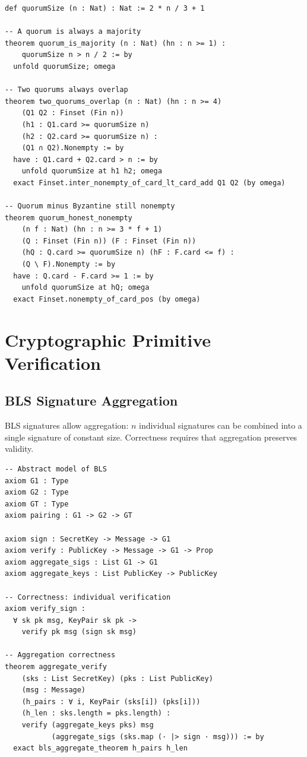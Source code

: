 \documentclass[11pt,a4paper]{article}
\begin{document}
\begin{lstlisting}[language=Lean,caption={Quorum properties}]
def quorumSize (n : Nat) : Nat := 2 * n / 3 + 1

-- A quorum is always a majority
theorem quorum_is_majority (n : Nat) (hn : n >= 1) :
    quorumSize n > n / 2 := by
  unfold quorumSize; omega

-- Two quorums always overlap
theorem two_quorums_overlap (n : Nat) (hn : n >= 4)
    (Q1 Q2 : Finset (Fin n))
    (h1 : Q1.card >= quorumSize n)
    (h2 : Q2.card >= quorumSize n) :
    (Q1 ∩ Q2).Nonempty := by
  have : Q1.card + Q2.card > n := by
    unfold quorumSize at h1 h2; omega
  exact Finset.inter_nonempty_of_card_lt_card_add Q1 Q2 (by omega)

-- Quorum minus Byzantine still nonempty
theorem quorum_honest_nonempty
    (n f : Nat) (hn : n >= 3 * f + 1)
    (Q : Finset (Fin n)) (F : Finset (Fin n))
    (hQ : Q.card >= quorumSize n) (hF : F.card <= f) :
    (Q \ F).Nonempty := by
  have : Q.card - F.card >= 1 := by
    unfold quorumSize at hQ; omega
  exact Finset.nonempty_of_card_pos (by omega)
\end{lstlisting}

\section{Cryptographic Primitive Verification}

\subsection{BLS Signature Aggregation}

BLS signatures allow aggregation: $n$ individual signatures can be combined into a single
signature of constant size. Correctness requires that aggregation preserves validity.

\begin{lstlisting}[language=Lean,caption={BLS aggregation correctness}]
-- Abstract model of BLS
axiom G1 : Type
axiom G2 : Type
axiom GT : Type
axiom pairing : G1 -> G2 -> GT

axiom sign : SecretKey -> Message -> G1
axiom verify : PublicKey -> Message -> G1 -> Prop
axiom aggregate_sigs : List G1 -> G1
axiom aggregate_keys : List PublicKey -> PublicKey

-- Correctness: individual verification
axiom verify_sign :
  ∀ sk pk msg, KeyPair sk pk ->
    verify pk msg (sign sk msg)

-- Aggregation correctness
theorem aggregate_verify
    (sks : List SecretKey) (pks : List PublicKey)
    (msg : Message)
    (h_pairs : ∀ i, KeyPair (sks[i]) (pks[i]))
    (h_len : sks.length = pks.length) :
    verify (aggregate_keys pks) msg
           (aggregate_sigs (sks.map (· |> sign · msg))) := by
  exact bls_aggregate_theorem h_pairs h_len
\end{lstlisting}
\end{document}
